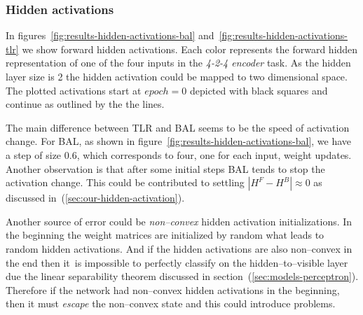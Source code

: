 \subsubsection{Hidden activations} 
\label{sec:tlr-auto4-hidden}

In figures~\ref{fig:results-hidden-activations-bal} and~\ref{fig:results-hidden-activations-tlr} we show forward hidden activations. Each color represents the forward hidden representation of one of the four inputs in the \emph{4-2-4 encoder} task. As the hidden layer size is 2 the hidden activation could be mapped to two dimensional space. The plotted activations start at $epoch=0$ depicted with black squares and continue as outlined by the the lines. 

The main difference between TLR and BAL seems to be the speed of activation change. For BAL, as shown in figure~\ref{fig:results-hidden-activations-bal}, we have a step of size 0.6, which corresponds to four, one for each input, weight updates. Another observation is that after some initial steps BAL tends to stop the activation change. This could be contributed to settling $|H^F-H^B| \approx 0$ as discussed in~(\ref{sec:our-hidden-activation}). 

Another source of error could be \emph{non--convex} hidden activation initializations. In the beginning the weight matrices are initialized by random what leads to random hidden activations. And if the hidden activations are also non--convex in the end then it~is impossible to perfectly classify on the hidden--to--visible layer due the linear separability theorem discussed in section~(\ref{sec:models-perceptron}). Therefore if the network had non--convex hidden activations in the beginning, then it must \emph{escape} the non--convex state and this could introduce problems. 


